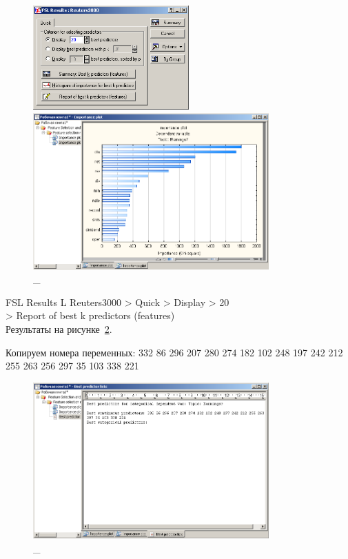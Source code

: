 \begin{figure}[!h]
  \centering

  \begin{minipage}{0.29\textwidth}
    \centering

    \includegraphics[height=4cm]
    {inc/21.PNG}

    \caption{\_}

    \label{fig:21}
  \end{minipage}
  \begin{minipage}{0.69\textwidth}
    \centering

    \includegraphics[height=6cm]
    {inc/22.PNG}

    \caption{\_}

    \label{fig:22}
  \end{minipage}
\end{figure}

\newpage

FSL Results L Reuters3000 > Quick > Display > 20 \\
> Report of best k predictors (features) \\

Результаты на рисунке~\ref{fig:23}.

Копируем номера переменных:
332 86 296 207 280 274 182 102 248 197 242 212 255 263 256 297 35 103 338 221

\begin{figure}[!h]
  \centering

  \includegraphics[height=6cm]
  {inc/23.PNG}

  \caption{\_}

  \label{fig:23}
\end{figure}

